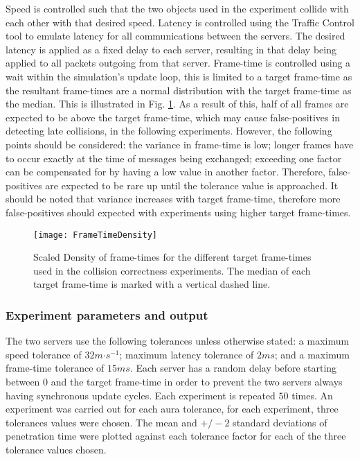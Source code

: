Speed is controlled such that the two objects used in the experiment collide with each other with that desired speed. Latency is controlled using the Traffic Control tool to emulate latency for all communications between the servers. The desired latency is applied as a fixed delay to each server, resulting in that delay being applied to all packets outgoing from that server. Frame-time is controlled using a wait within the simulation's update loop, this is limited to a target frame-time as the resultant frame-times are a normal distribution with the target frame-time as the median. This is illustrated in Fig. \ref{fig_FrameTimeDensity}. As a result of this, half of all frames are expected to be above the target frame-time, which may cause false-positives in detecting late collisions, in the following experiments. However, the following points should be considered: the variance in frame-time is low; longer frames have to occur exactly at the time of messages being exchanged; exceeding one factor can be compensated for by having a low value in another factor. Therefore, false-positives are expected to be rare up until the tolerance value is approached. It should be noted that variance increases with target frame-time, therefore more false-positives should expected with experiments using higher target frame-times.

\begin{figure}[t]
	\centering
	\texttt{[image: FrameTimeDensity]}
	\caption{Scaled Density of frame-times for the different target frame-times used in the collision correctness experiments. The median of each target frame-time is marked with a vertical dashed line.}
	\label{fig_FrameTimeDensity}
\end{figure}



\subsubsection{Experiment parameters and output}
The two servers use the following tolerances unless otherwise stated: a maximum speed tolerance of $32m\mathord{\cdot}s^{-1}$; maximum latency tolerance of $2ms$; and a maximum frame-time tolerance of $15ms$. Each server has a random delay before starting between $0$ and the target frame-time in order to prevent the two servers always having synchronous update cycles. Each experiment is repeated $50$ times. An experiment was carried out for each aura tolerance, for each experiment, three tolerances values were chosen. The mean and $+/-2$ standard deviations of penetration time were plotted against each tolerance factor for each of the three tolerance values chosen.

